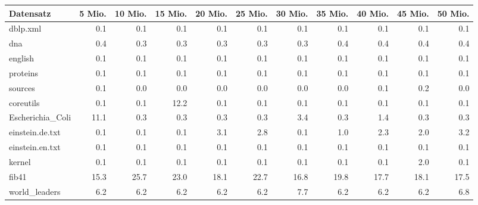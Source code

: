 \documentclass[10pt,a4paper]{standalone}
\begin{document}
\begin{tabular}{|l|r|r|r|r|r|r|r|r|r|r|}
\hline
Datensatz & 5 Mio. & 10 Mio. & 15 Mio. & 20 Mio. & 25 Mio. & 30 Mio. & 35 Mio. & 40 Mio. & 45 Mio. & 50 Mio.\\
\hline\hline
dblp.xml & 0.1 & 0.1 & 0.1 & 0.1 & 0.1 & 0.1 & 0.1 & 0.1 & 0.1 & 0.1 \\
dna & 0.4 & 0.3 & 0.3 & 0.3 & 0.3 & 0.3 & 0.4 & 0.4 & 0.4 & 0.4 \\
english & 0.1 & 0.1 & 0.1 & 0.1 & 0.1 & 0.1 & 0.1 & 0.1 & 0.1 & 0.1 \\
proteins & 0.1 & 0.1 & 0.1 & 0.1 & 0.1 & 0.1 & 0.1 & 0.1 & 0.1 & 0.1 \\
sources & 0.1 & 0.0 & 0.0 & 0.0 & 0.0 & 0.0 & 0.0 & 0.1 & 0.2 & 0.0 \\
coreutils & 0.1 & 0.1 & 12.2 & 0.1 & 0.1 & 0.1 & 0.1 & 0.1 & 0.1 & 0.1 \\
Escherichia\_Coli & 11.1 & 0.3 & 0.3 & 0.3 & 0.3 & 3.4 & 0.3 & 1.4 & 0.3 & 0.3 \\
einstein.de.txt & 0.1 & 0.1 & 0.1 & 3.1 & 2.8 & 0.1 & 1.0 & 2.3 & 2.0 & 3.2 \\
einstein.en.txt & 0.1 & 0.1 & 0.1 & 0.1 & 0.1 & 0.1 & 0.1 & 0.1 & 0.1 & 0.1 \\
kernel & 0.1 & 0.1 & 0.1 & 0.1 & 0.1 & 0.1 & 0.1 & 0.1 & 2.0 & 0.1 \\
fib41 & 15.3 & 25.7 & 23.0 & 18.1 & 22.7 & 16.8 & 19.8 & 17.7 & 18.1 & 17.5 \\
world\_leaders & 6.2 & 6.2 & 6.2 & 6.2 & 6.2 & 7.7 & 6.2 & 6.2 & 6.2 & 6.8 \\
\hline
\end{tabular}
\end{document}
